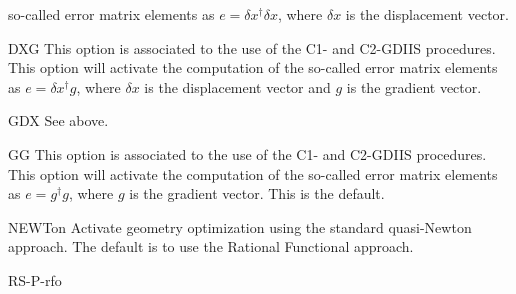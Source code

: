 \begin{keywordlist}
so-called error matrix elements as $e=\delta x^{\dagger}\delta x$,
where $\delta x$ is the displacement vector.
\item[DXG ]
This option is associated to the use of the C1- and C2-GDIIS
procedures. This option will activate the computation of the
so-called error matrix elements as $e=\delta x^{\dagger}g$,
where $\delta x$ is the displacement vector and $g$ is the
gradient vector.
\item[GDX ]
See above.
\item[GG]
This option is associated to the use of the C1- and C2-GDIIS
procedures. This option will activate the computation of the
so-called error matrix elements as $e=g^{\dagger}g$,
where $g$ is the gradient vector. This is the default.
\item[NEWTon]
Activate geometry optimization using the standard quasi-Newton approach.
The default is to use the Rational Functional approach.
\item[RS-P-rfo]

\end{keywordlist}
